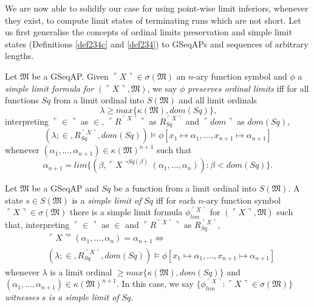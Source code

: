 \documentclass[12pt]{article}
\numberwithin{equation}{section}
\begin{document}
We are now able to solidify our case for using point-wise limit inferiors, whenever they exist, to compute limit states of terminating runs which are not short. Let us first generalise the concepts of ordinal limits preservation and simple limit states (Definitions \ref{def234c} and \ref{def234}) to GSeqAPs and sequences of arbitrary lengths.

\begin{defi}\label{257c}
Let $\mathfrak{M}$ be a GSeqAP. Given $\ulcorner X \urcorner \in \sigma(\mathfrak{M})$ an $n$-ary function symbol and $\phi$ a \emph{simple limit formula for} $(\ulcorner X \urcorner, \mathfrak{M})$, we say $\phi$ \emph{preserves ordinal limits} iff for all functions $Sq$ from a limit ordinal into $S(\mathfrak{M})$ and all limit ordinals 
\begin{equation*}
    \lambda \geq max\{\kappa(\mathfrak{M}), dom(Sq)\} \text{,}
\end{equation*}
interpreting $\ulcorner \in \urcorner$ as $\in$, $\ulcorner R^{\ulcorner X \urcorner} \urcorner$ as $R_{Sq}^{\ulcorner X \urcorner}$ and $\ulcorner dom \urcorner$ as $dom(Sq)$, 
\begin{equation*}
    (\lambda; \in, R_{Sq}^{\ulcorner X \urcorner}, dom(Sq)) \models \phi[x_1 \mapsto \alpha_1, \dots, x_{n+1} \mapsto \alpha_{n+1}]
\end{equation*}
whenever $(\alpha_1, \dots, \alpha_{n+1}) \in \kappa(\mathfrak{M})^{n+1}$ such that 
\begin{equation*}
    \alpha_{n+1} = lim \{(\beta, \ulcorner X \urcorner^{Sq(\beta)}(\alpha_1, \dots, \alpha_n)) : \beta < dom(Sq)\} \text{.}
\end{equation*}
\end{defi}

\begin{defi}\label{def256}
Let $\mathfrak{M}$ be a GSeqAP and $Sq$ be a function from a limit ordinal into $S(\mathfrak{M})$. A state $s \in S(\mathfrak{M})$ is a \emph{simple limit of} $Sq$ iff for each $n$-ary function symbol $\ulcorner X \urcorner \in \sigma(\mathfrak{M})$ there is a simple limit formula $\phi_{lim}^{\ulcorner X \urcorner}$ for $(\ulcorner X \urcorner, \mathfrak{M})$ such that, interpreting $\ulcorner \in \urcorner$ as $\in$ and $\ulcorner R^{\ulcorner X \urcorner} \urcorner$ as $R_{Sq}^{\ulcorner X \urcorner}$, 
\begin{align*}
    & \ulcorner X \urcorner^s (\alpha_1, \dots, \alpha_n) = \alpha_{n+1} \iff \\
    & (\lambda; \in, R_{Sq}^{\ulcorner X \urcorner}, dom(Sq)) \models \phi[x_1 \mapsto \alpha_1, \dots, x_{n+1} \mapsto \alpha_{n+1}]
\end{align*}
whenever $\lambda$ is a limit ordinal $\geq max\{\kappa(\mathfrak{M}), dom(Sq)\}$ and $(\alpha_1, \dots, \alpha_{n+1}) \in \kappa(\mathfrak{M})^{n+1}$. In this case, we say $\{\phi_{lim}^{\ulcorner X \urcorner} : \ulcorner X \urcorner \in \sigma(\mathfrak{M})\}$ \emph{witnesses} $s$ \emph{is a simple limit of} $Sq$.
\end{defi}
\end{document}
